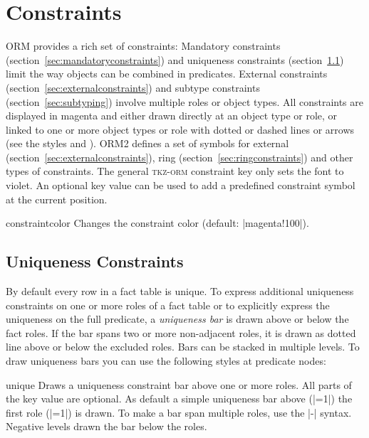 \documentclass[a4paper,10pt]{article}
\begin{document}
\section{Constraints}
\label{sec:constraints}
ORM provides a rich set of constraints: Mandatory constraints (section~\ref{sec:mandatoryconstraints}) and uniqueness constraints (section~\ref{sec:uniquenessconstraints}) limit the way objects can be combined in predicates. External constraints (section~\ref{sec:externalconstraints}) and subtype constraints (section~\ref{sec:subtyping}) involve multiple roles or object types. All constraints are displayed in magenta and either drawn directly at an object type or role, or linked to one or more object types or role with dotted or dashed lines or arrows (see the styles  and ). ORM2 defines a set of symbols for external (section~\ref{sec:externalconstraints}), ring (section~\ref{sec:ringconstraints}) and other types of constraints. The general \textsc{tkz-orm} constraint key  only sets the font to violet. An optional key value can be used to add a predefined constraint symbol at the current position.

\begin{stylekey}{constraintcolor}
Changes the constraint color (default: |magenta!100|).
\end{stylekey}

\subsection{Uniqueness Constraints}
\label{sec:uniquenessconstraints}
By default every row in a fact table is unique. To express additional uniqueness constraints on one or more roles of a fact table or to explicitly express the uniqueness on the full predicate, a \emph{uniqueness bar} is drawn above or below the fact roles. If the bar spans two or more non-adjacent roles, it is drawn as dotted line above or below the excluded roles. Bars can be stacked in multiple levels. To draw uniqueness bars you can use the following styles at predicate nodes:


\begin{stylekey}{unique}
Draws a uniqueness constraint bar above one or more roles. All parts of the key value are optional. As default a simple uniqueness bar above (|=1|) the first role (|=1|) is drawn. To make a bar span multiple roles, use the |-| syntax. Negative levels drawn the bar below the roles.
\begin{codeexample}[]
\end{codeexample}
\end{stylekey}
\end{document}
